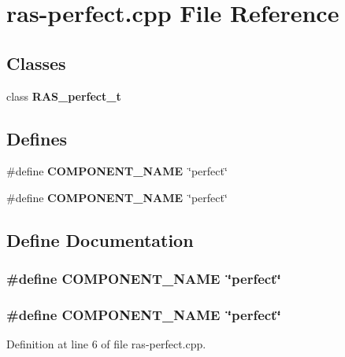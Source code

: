 \section{ras-perfect.cpp File Reference}
\label{ras-perfect_8cpp}
\subsection*{Classes}
\begin{CompactItemize}
\item 
class {\bf RAS\_\-perfect\_\-t}
\end{CompactItemize}
\subsection*{Defines}
\begin{CompactItemize}
\item 
\#define {\bf COMPONENT\_\-NAME}~\char`\"{}perfect\char`\"{}
\item 
\#define {\bf COMPONENT\_\-NAME}~\char`\"{}perfect\char`\"{}
\end{CompactItemize}


\subsection{Define Documentation}
\subsubsection[{COMPONENT\_\-NAME}]{\setlength{\rightskip}{0pt plus 5cm}\#define COMPONENT\_\-NAME~\char`\"{}perfect\char`\"{}}\label{zesto-bpred_8cpp_9146ade7ce24e3db226a973a59063892}


\subsubsection[{COMPONENT\_\-NAME}]{\setlength{\rightskip}{0pt plus 5cm}\#define COMPONENT\_\-NAME~\char`\"{}perfect\char`\"{}}\label{ras-perfect_8cpp_9146ade7ce24e3db226a973a59063892}




Definition at line 6 of file ras-perfect.cpp.